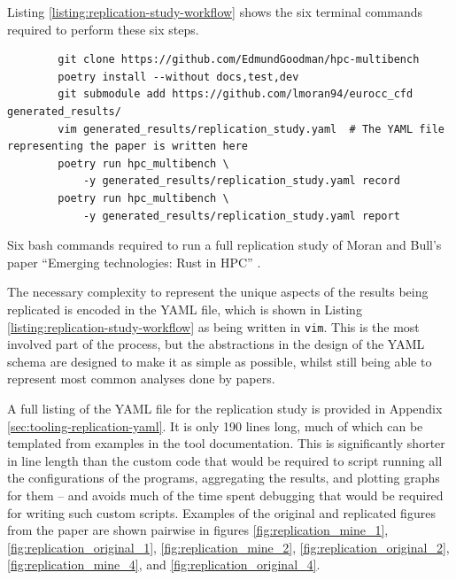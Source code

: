 Listing \ref{listing:replication-study-workflow} shows the six terminal commands required to perform these six steps.

\begin{listing}[H]
    \begin{verbatim}
        git clone https://github.com/EdmundGoodman/hpc-multibench
        poetry install --without docs,test,dev
        git submodule add https://github.com/lmoran94/eurocc_cfd generated_results/
        vim generated_results/replication_study.yaml  # The YAML file representing the paper is written here
        poetry run hpc_multibench \
            -y generated_results/replication_study.yaml record
        poetry run hpc_multibench \
            -y generated_results/replication_study.yaml report
    \end{verbatim}
    \caption{Six bash commands required to run a full replication study of Moran and Bull's paper ``Emerging technologies: Rust in HPC'' \cite{moranEmergingTechnologiesRust2023}.}
    \label{listing:replication-study-workflow}
\end{listing}

The necessary complexity to represent the unique aspects of the results being replicated is encoded in the YAML file, which is shown in Listing \ref{listing:replication-study-workflow} as being written in \texttt{vim}. This is the most involved part of the process, but the abstractions in the design of the YAML schema are designed to make it as simple as possible, whilst still being able to represent most common analyses done by papers.

A full listing of the YAML file for the replication study is provided in Appendix \ref{sec:tooling-replication-yaml}. It is only 190 lines long, much of which can be templated from examples in the tool documentation. This is significantly shorter in line length than the custom code that would be required to script running all the configurations of the programs, aggregating the results, and plotting graphs for them -- and avoids much of the time spent debugging that would be required for writing such custom scripts. Examples of the original and replicated figures from the paper are shown pairwise in figures \ref{fig:replication_mine_1}, \ref{fig:replication_original_1}, \ref{fig:replication_mine_2}, \ref{fig:replication_original_2}, \ref{fig:replication_mine_4}, and \ref{fig:replication_original_4}.

